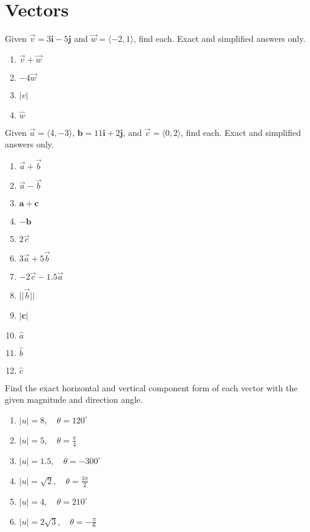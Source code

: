 \chapter{Vectors}

Given $\vec{v} = 3\mathbf{i} - 5\mathbf{j}$ and $\vec{w} = \langle -2, 1 \rangle$, find each. Exact and simplified answers only.
\begin{multicols}{4}
\begin{enumerate}  
    \item $\vec{v} + \vec{w}$
    \item $-4\vec{w}$
    \item $|v|$
    \item $\hat{w}$
\end{enumerate} \setcounter{Review}{\value{enumi}}
\end{multicols}
\bigskip

Given $\vec{a} = \langle 4, -3 \rangle$, $\mathbf{b} = 11\mathbf{i} + 2\mathbf{j}$, and $\vec{c} = \langle 0, 2 \rangle$, find each. Exact and simplified answers only.
\begin{multicols}{3}
\begin{enumerate}		\setcounter{enumi}{\value{Review}}
	\item $\vec{a} + \vec{b}$
	\item $\vec{a} - \vec{b}$
	\item $\mathbf{a} + \mathbf{c}$
	\item $-\mathbf{b}$
	\item $2\vec{c}$
	\item $3\vec{a} + 5\vec{b}$
	\item $-2\vec{c} - 1.5\vec{a}$
	\item $||\vec{b}||$
	\item $|\mathbf{c}|$
	\item $\hat{a}$
	\item $\hat{b}$
	\item $\hat{c}$
\end{enumerate}		\setcounter{Review}{\value{enumi}}
\end{multicols}
\bigskip

Find the exact horizontal and vertical component form of each vector with the given magnitude and direction angle.
\begin{multicols}{3}
\begin{enumerate}	\setcounter{enumi}{\value{Review}}
	\item $|u| = 8, \quad \theta = 120^\circ$
	\item $|u| = 5, \quad \theta = \frac{\pi}{4}$
	\item $|u| = 1.5, \quad \theta = -300^\circ$
	\item $|u| = \sqrt{2}, \quad \theta = \frac{3\pi}{2}$
	\item $|u| = 4, \quad \theta = 210^\circ$
	\item $|u| = 2\sqrt{3}, \quad \theta = -\frac{\pi}{6}$
\end{enumerate}	\setcounter{Review}{\value{enumi}}
\end{multicols}
\bigskip

